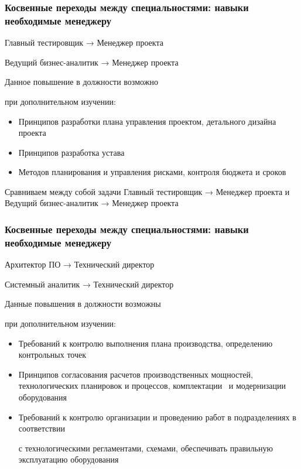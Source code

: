 \documentclass{../industrial-development}
\begin{document}
\begin{frame} \frametitle{Косвенные переходы между специальностями: навыки необходимые менеджеру}

\begin{block}{Главный тестировщик → Менеджер проекта 

 Ведущий бизнес-аналитик → Менеджер проекта}

Данное повышение в должности возможно  

при дополнительном изучении:
  \end{block}
  \begin{itemize}
  \item Принципов разработки плана управления проектом, детального дизайна проекта
  \item Принципов разработка устава
 \item Методов планирования и управления рисками, контроля бюджета и сроков
  \end{itemize}
\end{frame}

\lecturenotes

Сравниваем между собой задачи Главный тестировщик → Менеджер проекта и
 Ведущий бизнес-аналитик → Менеджер проекта


\begin{frame} \frametitle{Косвенные переходы между специальностями: навыки необходимые менеджеру}

\begin{block}{Архитектор ПО  → Технический директор  

Системный аналитик → Технический директор }

Данные повышения в должности возможны 

при дополнительном изучении:
  \end{block}
  \begin{itemize}
  \item Требований к контролю выполнения плана производства, определению контрольных точек
  \item Принципов согласования расчетов производственных мощностей, технологических планировок и  процессов, комплектации ~и модернизации оборудования 
  \item Требований к контролю организации и проведению работ в  подразделениях в соответствии 

с технологическими регламентами, схемами, обеспечивать правильную эксплуатацию оборудования 
  \end{itemize}
\end{frame}
\end{document}
